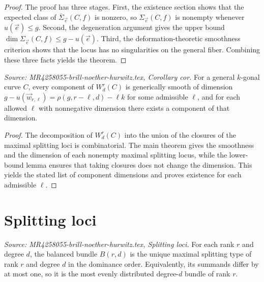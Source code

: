 \begin{proof}
  The proof has three stages. First, the existence section shows that the expected class of \(\overline{\Sigma}_{\vec e}(C,f)\) is nonzero, so \(\Sigma_{\vec e}(C,f)\) is nonempty whenever \(u(\vec e)\le g\). Second, the degeneration argument gives the upper bound \(\dim \Sigma_{\vec e}(C,f)\le g-u(\vec e)\). Third, the deformation-theoretic smoothness criterion shows that the locus has no singularities on the general fiber. Combining these three facts yields the theorem.
\end{proof}

\begin{corollary}[Components of \(W^r_d(C)\)]
  \label{cor:cor}
  \textit{Source: MR4258055-brill-noether-hurwitz.tex, Corollary cor.}
  For a general \(k\)-gonal curve \(C\), every component of \(W^r_d(C)\) is generically smooth of dimension \(g-u(\vec w_{r,\ell})=\rho(g,r-\ell,d)-\ell k\) for some admissible \(\ell\), and for each allowed \(\ell\) with nonnegative dimension there exists a component of that dimension.
\end{corollary}

\begin{proof}
  The decomposition of \(W^r_d(C)\) into the union of the closures of the maximal splitting loci is combinatorial. The main theorem gives the smoothness and the dimension of each nonempty maximal splitting locus, while the lower-bound lemma ensures that taking closures does not change the dimension. This yields the stated list of component dimensions and proves existence for each admissible \(\ell\).
\end{proof}

\section{Splitting loci}

\begin{definition}
  \label{def:balanced-bundle}
  \textit{Source: MR4258055-brill-noether-hurwitz.tex, Splitting loci.}
  For each rank \(r\) and degree \(d\), the balanced bundle \(B(r,d)\) is the unique maximal splitting type of rank \(r\) and degree \(d\) in the dominance order. Equivalently, its summands differ by at most one, so it is the most evenly distributed degree-\(d\) bundle of rank \(r\).
\end{definition}

